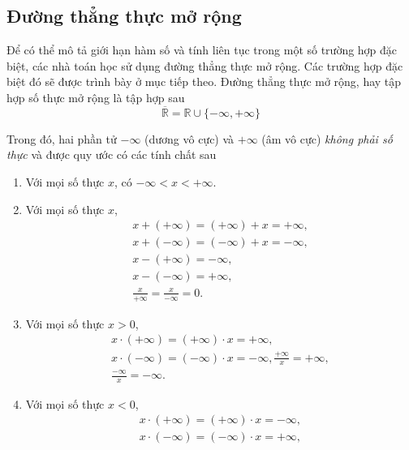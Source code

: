 \subsection{Đường thẳng thực mở rộng}

Để có thể mô tả giới hạn hàm số và tính liên tục trong một số trường hợp đặc biệt, các nhà toán học sử dụng đường thẳng thực mở rộng. Các trường hợp đặc biệt đó sẽ được trình bày ở mục tiếp theo. Đường thẳng thực mở rộng, hay tập hợp số thực mở rộng là tập hợp sau
\[
    \overline{\mathbb{R}} = \mathbb{R} \cup \{ -\infty, +\infty \}
\]

Trong đó, hai phần tử $-\infty$ (dương vô cực) và $+\infty$ (âm vô cực) \textit{không phải số thực} và được quy ước có các tính chất sau
\begin{enumerate}[label={(\roman*)}]
    \item Với mọi số thực $x$, có $-\infty < x < +\infty$.
    \item Với mọi số thực $x$,
          \[
              \begin{split}
                  x + (+\infty) = (+\infty) + x = +\infty, \\
                  x + (-\infty) = (-\infty) + x = -\infty, \\
                  x - (+\infty) = -\infty, \\
                  x - (-\infty) = +\infty, \\
                  \frac{x}{+\infty} = \frac{x}{-\infty} = 0.
              \end{split}
          \]
    \item Với mọi số thực $x > 0$,
          \[
              \begin{split}
                  x \cdot (+\infty) = (+\infty) \cdot x = +\infty, \\
                  x \cdot (-\infty) = (-\infty) \cdot x = -\infty,
                  \frac{+\infty}{x} = +\infty, \\
                  \frac{-\infty}{x} = -\infty.
              \end{split}
          \]
    \item Với mọi số thực $x < 0$,
          \[
              \begin{split}
                  x \cdot (+\infty) = (+\infty) \cdot x = -\infty, \\
                  x \cdot (-\infty) = (-\infty) \cdot x = +\infty, \\

\end{split}\]
\end{enumerate}
